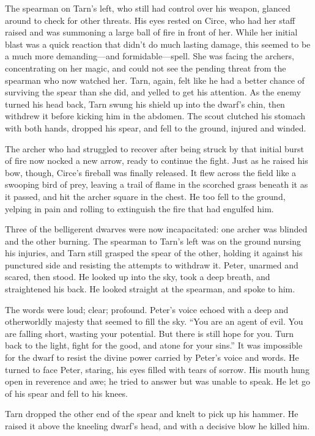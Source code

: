 The spearman on Tarn's left, who still had control over his weapon, glanced around to check for other threats.  His eyes rested on Circe, who had her staff raised and was summoning a large ball of fire in front of her.  While her initial blast was a quick reaction that didn't do much lasting damage, this seemed to be a much more demanding---and formidable---spell.  She was facing the archers, concentrating on her magic, and could not see the pending threat from the spearman who now watched her.  Tarn, again, felt like he had a better chance of surviving the spear than she did, and yelled to get his attention.  As the enemy turned his head back, Tarn swung his shield up into the dwarf's chin, then withdrew it before kicking him in the abdomen.  The scout clutched his stomach with both hands, dropped his spear, and fell to the ground, injured and winded.

The archer who had struggled to recover after being struck by that initial burst of fire now nocked a new arrow, ready to continue the fight.  Just as he raised his bow, though, Circe's fireball was finally released.  It flew across the field like a swooping bird of prey, leaving a trail of flame in the scorched grass beneath it as it passed, and hit the archer square in the chest.  He too fell to the ground, yelping in pain and rolling to extinguish the fire that had engulfed him.

Three of the belligerent dwarves were now incapacitated: one archer was blinded and the other burning.  The spearman to Tarn's left was on the ground nursing his injuries, and Tarn still grasped the spear of the other, holding it against his punctured side and resisting the attempts to withdraw it.  Peter, unarmed and scared, then stood.  He looked up into the sky, took a deep breath, and straightened his back.  He looked straight at the spearman, and spoke to him.

The words were loud; clear; profound.  Peter's voice echoed with a deep and otherworldly majesty that seemed to fill the sky.   ``You are an agent of evil.  You are falling short, wasting your potential.  But there is still hope for you.  Turn back to the light, fight for the good, and atone for your sins.'' It was impossible for the dwarf to resist the divine power carried by Peter's voice and words.  He turned to face Peter, staring, his eyes filled with tears of sorrow.  His mouth hung open in reverence and awe; he tried to answer but was unable to speak.  He let go of his spear and fell to his knees.

Tarn dropped the other end of the spear and knelt to pick up his hammer.  He raised it above the kneeling dwarf's head, and with a decisive blow he killed him.

